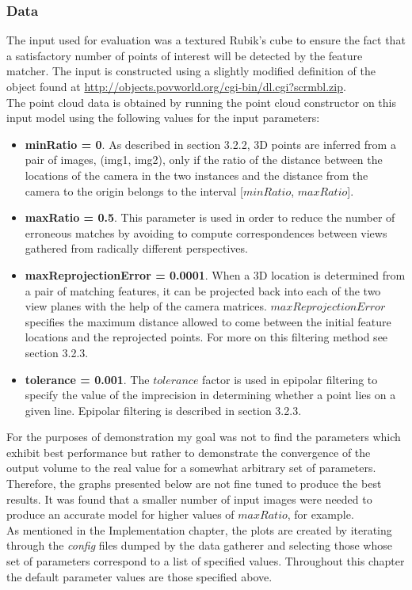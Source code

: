\documentclass[12pt,a4paper,twoside,openright]{report}
\begin{document}
\subsubsection{Data}
The input used for evaluation was a textured Rubik's cube to ensure the fact that a satisfactory number of points of interest will be detected by the feature matcher. The input is constructed using a slightly modified definition of the object found at \url{http://objects.povworld.org/cgi-bin/dl.cgi?scrmbl.zip}.\\
The point cloud data is obtained by running the point cloud constructor on this input model using the following values for the input parameters:
\begin{itemize}
\item \textbf{minRatio = 0}. As described in section 3.2.2, 3D points are inferred from a pair of images, (img1, img2), only if the ratio of the distance between the locations of the camera in the two instances and the distance from the camera to the origin belongs to the interval [$minRatio$, $maxRatio$].
\item \textbf{maxRatio = 0.5}. This parameter is used in order to reduce the number of erroneous matches by avoiding to compute correspondences between views gathered from radically different perspectives.
\item \textbf{maxReprojectionError = 0.0001}. When a 3D location is determined from a pair of matching features, it can be projected back into each of the two view planes with the help of the camera matrices. $maxReprojectionError$ specifies the maximum distance allowed to come between the initial feature locations and the reprojected points. For more on this filtering method see section 3.2.3. 
\item \textbf{tolerance = 0.001}. The $tolerance$ factor is used in epipolar filtering to specify the value of the imprecision in determining whether a point lies on a given line. Epipolar filtering is described in section 3.2.3. 
\end{itemize}

For the purposes of demonstration my goal was not to find the parameters which exhibit best performance but rather to demonstrate the convergence of the output volume to the real value for a somewhat arbitrary set of parameters. Therefore, the graphs presented below are not fine tuned to produce the best results. It was found that a smaller number of input images were needed to produce an accurate model for higher values of $maxRatio$, for example. \\
\linebreak
As mentioned in the Implementation chapter, the plots are created by iterating through the \emph{config} files dumped by the data gatherer and selecting those whose set of parameters correspond to a list of specified values. Throughout this chapter the default parameter values are those specified above. 
\end{document}
